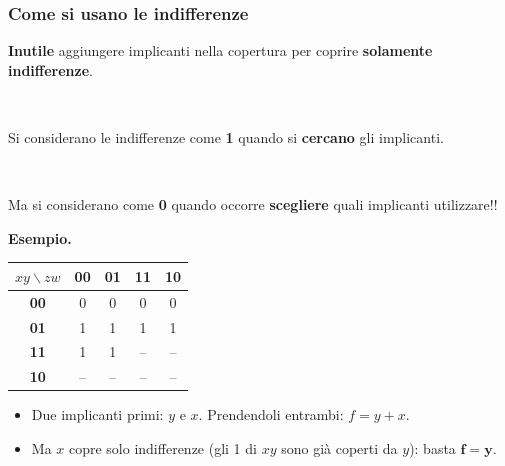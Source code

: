 \documentclass[12pt, a4paper]{article}
\begin{document}
\subsubsection{Come si usano le indifferenze}

\begin{center}
\colorbox{red!15}{\parbox{0.9\linewidth}{\centering \textbf{Inutile} aggiungere implicanti nella copertura per coprire \textbf{solamente indifferenze}.}}\\[2mm]
\colorbox{green!15}{\parbox{0.9\linewidth}{\centering Si considerano le indifferenze come \textbf{1} quando si \textbf{cercano} gli implicanti.}}\\[2mm]
\colorbox{yellow!30}{\parbox{0.9\linewidth}{\centering Ma si considerano come \textbf{0} quando occorre \textbf{scegliere} quali implicanti utilizzare!!}}
\end{center}

\textbf{Esempio.}
\begin{center}
\renewcommand{\arraystretch}{1.25}
\begin{tabular}[t]{|c|c|c|c|c|}
\hline
\colorbox{gray!25}{\color{black}$xy\backslash zw$} & \colorbox{gray!25}{\color{black}\textbf{00}} & \colorbox{gray!25}{\color{black}\textbf{01}} & \colorbox{gray!25}{\color{black}\textbf{11}} & \colorbox{gray!25}{\color{black}\textbf{10}} \\ \hline
\colorbox{gray!25}{\color{black}\textbf{00}} & 0 & 0 & 0 & 0 \\ \hline
\colorbox{gray!25}{\color{black}\textbf{01}} & \colorbox{blue!25}{\color{black}1} & \colorbox{blue!25}{\color{black}1} & \colorbox{blue!25}{\color{black}1} & \colorbox{blue!25}{\color{black}1} \\ \hline
\colorbox{gray!25}{\color{black}\textbf{11}} & \colorbox{orange!55}{\color{black}1} & \colorbox{orange!55}{\color{black}1} & \colorbox{orange!55}{\color{black}--} & \colorbox{orange!55}{\color{black}--} \\ \hline
\colorbox{gray!25}{\color{black}\textbf{10}} & \colorbox{green!30}{\color{black}--} & \colorbox{green!30}{\color{black}--} & \colorbox{green!30}{\color{black}--} & \colorbox{green!30}{\color{black}--} \\ \hline
\end{tabular}
\end{center}
\begin{itemize}
    \item Due implicanti primi: $y$ e $x$. Prendendoli entrambi: $f = y + x$.
    \item Ma $x$ copre solo indifferenze (gli 1 di $xy$ sono già coperti da $y$): basta $\mathbf{f = y}$.
\end{itemize}
\end{document}
